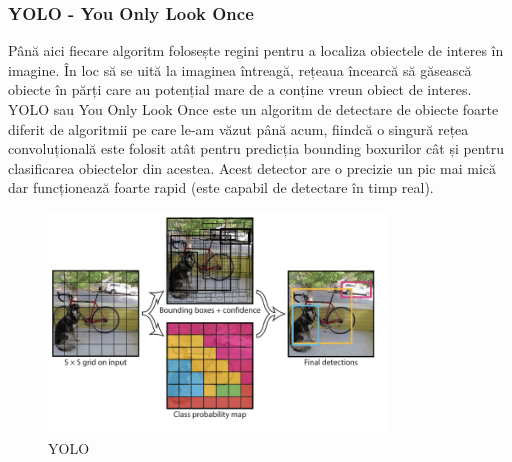 \subsubsection{YOLO - You Only Look Once}
Până aici fiecare algoritm folosește regini pentru a localiza obiectele de interes în imagine. În loc să se uită la imaginea întreagă, rețeaua încearcă să găsească obiecte în părți care au potențial mare de a conține vreun obiect de interes.\newline
YOLO sau You Only Look Once este un algoritm de detectare de obiecte foarte diferit de algoritmii pe care le-am văzut până acum, fiindcă o singură rețea convoluțională este folosit atât pentru predicția bounding boxurilor cât și pentru clasificarea obiectelor din acestea.\newline
Acest detector are o precizie un pic mai mică dar funcționează foarte rapid (este capabil de detectare în timp real).

\begin{figure}[h!]
    	\centering
	\captionsetup{justification=centering, margin=2cm}
	\includegraphics[width=0.8\textwidth]{figures/yolo1.png}
	\caption{YOLO \cite{rcnn_vs_fast_rcnn}}
	\label{fig:class_detect_segment}
\end{figure}

